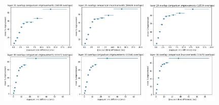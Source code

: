 \documentclass[letterpaper,11pt]{article}
\begin{document}
\begin{figure}[!ht]
\centering
\includegraphics[width=0.32\textwidth]{images/results/improvements_by_layer_polaris/layer_21_improvements_polaris}
\includegraphics[width=0.32\textwidth]{images/results/improvements_by_layer_polaris/layer_25_improvements_polaris}
\includegraphics[width=0.32\textwidth]{images/results/improvements_by_layer_polaris/layer_29_improvements_polaris}
\includegraphics[width=0.32\textwidth]{images/results/improvements_by_layer_polaris/layer_30_improvements_polaris}
\includegraphics[width=0.32\textwidth]{images/results/improvements_by_layer_polaris/layer_33_improvements_polaris}
\includegraphics[width=0.32\textwidth]{images/results/improvements_by_layer_polaris/layer_36_improvements_polaris}

\end{figure}
\end{document}
